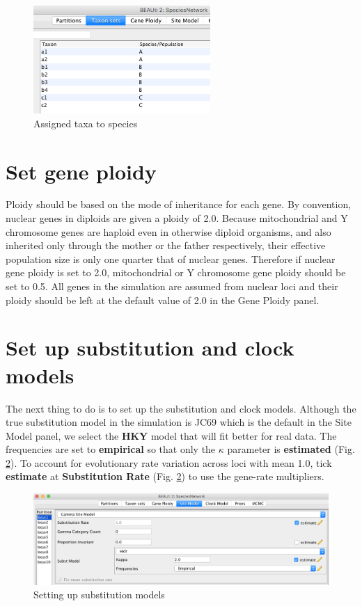 \documentclass[11pt]{article}
\begin{document}
\begin{figure}[h]
\center
\includegraphics[width=0.6\textwidth]{figs/fig4_mapping}
\caption{Assigned taxa to species}
\label{fig_mapping}
\end{figure}

\section*{Set gene ploidy}

Ploidy should be based on the mode of inheritance for each gene. By convention, nuclear genes in diploids are given a ploidy of 2.0. Because mitochondrial and Y chromosome genes are haploid even in otherwise diploid organisms, and also inherited only through the mother or the father respectively, their effective population size is only one quarter that of nuclear genes. Therefore if nuclear gene ploidy is set to 2.0, mitochondrial or Y chromosome gene ploidy should be set to 0.5. All genes in the simulation are assumed from nuclear loci and their ploidy should be left at the default value of 2.0 in the Gene Ploidy panel.

\section*{Set up substitution and clock models}

The next thing to do is to set up the substitution and clock models.
Although the true substitution model in the simulation is JC69 which is the default in the Site Model panel, we select the {\bf HKY} model \citep{Hasegawa:1985ww} that will fit better for real data. The frequencies are set to {\bf empirical} so that only the $\kappa$ parameter is {\bf estimated} (Fig. \ref{fig_sitemodel}).
To account for evolutionary rate variation across loci with mean 1.0, tick {\bf estimate} at {\bf Substitution Rate} (Fig. \ref{fig_sitemodel}) to use the gene-rate multipliers.

\begin{figure}[h]
\center
\includegraphics[width=1.0\textwidth]{figs/fig5_sitemodel}
\caption{Setting up substitution models}
\label{fig_sitemodel}
\end{figure}
\end{document}
